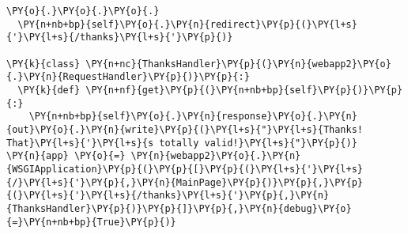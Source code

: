 \begin{Verbatim}[commandchars=\\\{\}]
  \PY{o}{.}\PY{o}{.}\PY{o}{.}
  \PY{n+nb+bp}{self}\PY{o}{.}\PY{n}{redirect}\PY{p}{(}\PY{l+s}{'}\PY{l+s}{/thanks}\PY{l+s}{'}\PY{p}{)}

\PY{k}{class} \PY{n+nc}{ThanksHandler}\PY{p}{(}\PY{n}{webapp2}\PY{o}{.}\PY{n}{RequestHandler}\PY{p}{)}\PY{p}{:}
  \PY{k}{def} \PY{n+nf}{get}\PY{p}{(}\PY{n+nb+bp}{self}\PY{p}{)}\PY{p}{:}
    \PY{n+nb+bp}{self}\PY{o}{.}\PY{n}{response}\PY{o}{.}\PY{n}{out}\PY{o}{.}\PY{n}{write}\PY{p}{(}\PY{l+s}{"}\PY{l+s}{Thanks! That}\PY{l+s}{'}\PY{l+s}{s totally valid!}\PY{l+s}{"}\PY{p}{)}
\PY{n}{app} \PY{o}{=} \PY{n}{webapp2}\PY{o}{.}\PY{n}{WSGIApplication}\PY{p}{(}\PY{p}{[}\PY{p}{(}\PY{l+s}{'}\PY{l+s}{/}\PY{l+s}{'}\PY{p}{,}\PY{n}{MainPage}\PY{p}{)}\PY{p}{,}\PY{p}{(}\PY{l+s}{'}\PY{l+s}{/thanks}\PY{l+s}{'}\PY{p}{,}\PY{n}{ThanksHandler}\PY{p}{)}\PY{p}{]}\PY{p}{,}\PY{n}{debug}\PY{o}{=}\PY{n+nb+bp}{True}\PY{p}{)}
\end{Verbatim}
